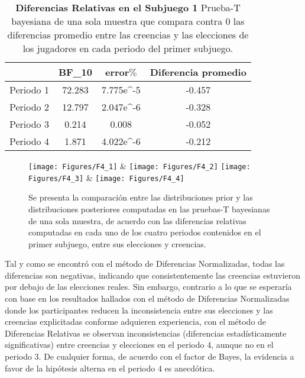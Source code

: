\begin{table}[h]
\caption[Prueba t de una muestra: Diferencias Relativas en el Subjuego 1]{\textbf{Diferencias Relativas en el Subjuego 1} Prueba-T bayesiana de una sola muestra que compara contra 0 las diferencias promedio entre las creencias y las elecciones de los jugadores en cada periodo del primer subjuego.}
\label{DR-S1-B}
\centering
\begin{tabular}{l | c c | c}
\toprule
\textbf{} & \textbf{BF_10} & \textbf{error$\%$} & \textbf{Diferencia promedio}\\
\midrule
Periodo 1 & 72.283 & 7.775e^-5 & -0.457\\
Periodo 2 & 12.797 & 2.047e^-6 & -0.328\\
Periodo 3 & 0.214 & 0.008 & -0.052\\
Periodo 4 & 1.871 & 4.022e^-6 & -0.212\\
\bottomrule
\end{tabular}
\end{table}
	


\begin{figure}[hp]
\centering
\texttt{[image: Figures/F4\_1]} & \texttt{[image: Figures/F4\_2]} 
\texttt{[image: Figures/F4\_3]} & \texttt{[image: Figures/F4\_4]} 
\decoRule
\caption[Evaluación de las Diferencias Normalizadas entre creencias y elecciones en el Subjuegoo 1 (Factor de Bayes)]{Se presenta la comparación entre las distribuciones prior y las distribuciones posteriores computadas en las pruebas-T bayesianas de una sola muestra, de acuerdo con las diferencias relativas computadas en cada uno de los cuatro periodos contenidos en el primer subjuego, entre sus elecciones y creencias.}
\label{fig:DR_S1}
\end{figure}

Tal y como se encontró con el método de Diferencias Normalizadas, todas las diferencias son negativas, indicando que consistentemente las creencias estuvieron por debajo de las elecciones reales. Sin embargo, contrario a lo que se esperaría con base en los resultados hallados con el método de Diferencias Normalizadas donde los participantes reducen la inconsistencia entre sus elecciones y las creencias explicitadas conforme adquieren experiencia, con el método de Diferencias Relativas se observan inconsistencias (diferencias estadísticamente significativas) entre creencias y elecciones en el periodo 4, aunque no en el periodo 3. De cualquier forma, de acuerdo con el factor de Bayes, la evidencia a favor de la hipótesis alterna en el periodo 4 es anecdótica.\\

